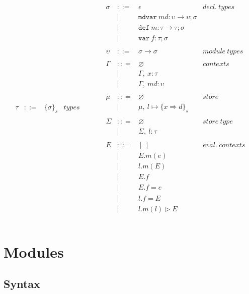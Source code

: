 \documentclass{llncs}
\newcommand{\keywadj}[1]{\mathtt{#1}}
\newcommand{\keyw}[1]{\keywadj{#1}~}
\begin{document}
\[\begin{array}{lll}
\begin{array}{lllr}
\tau & ::= & \{ \sigma \}_{s} & types \\
&&\\
\end{array}
& ~~~~~~
&
\begin{array}{lllr}
\sigma & ::= & \epsilon & decl.~ types \\
       & |   & \keyw{mdvar} md : \upsilon \rightarrow \upsilon; \sigma \\ %
       & |   & \keyw{def} m:\tau \rightarrow \tau; \sigma \\ %
       & |   & \keyw{var} f:\tau; \sigma \\
&&\\
\upsilon & ::= & \sigma \rightarrow \sigma & module~ types \\ %
&&\\
\Gamma & :: = & \varnothing & contexts\\
& | & \Gamma,~x : \tau\\
& | & \Gamma,~md : \upsilon\\
&&\\
\mu & :: = & \varnothing & store\\
& | & \mu,~l \mapsto \{ x \Rightarrow d \}_{s}\\
&&\\
\Sigma & :: = & \varnothing & store~type\\
& | & \Sigma,~l : \tau\\
&&\\
E & ::= & [~] & eval.~ contexts\\
  & |   & E.m(e)\\
  & |   & l.m(E)\\
  & |   & E.f \\
  & |   & E.f = e \\
  & |   & l.f = E \\
  & |   & l.m(l) \rhd E \\
&&\\
\end{array}
\end{array}
\]

\newpage

\section{Modules}

\subsection{Syntax}
\end{document}
